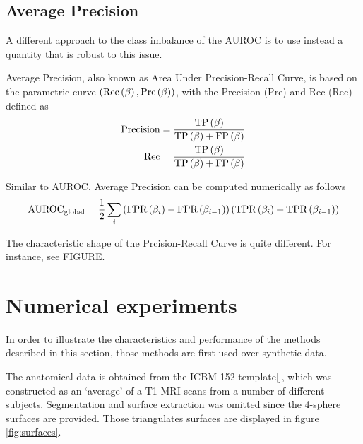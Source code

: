 \subsection{Average Precision}

A different approach to the class imbalance of the AUROC is to use instead a quantity that is robust to this issue.

Average Precision, also known as Area Under Precision-Recall Curve, is based on the parametric curve 
$\left( \text{Rec}\left( \beta \right), \text{Pre}\left( \beta \right) \right)$, with the Precision (Pre) and Rec (Rec) defined as
\begin{align}
\text{Precision}
&=
\frac{ \text{TP}\left( \beta \right) }{\text{TP}\left( \beta \right) + \text{FP}\left( \beta \right)}
\\
\text{Rec}
&=
\frac{ \text{TP}\left( \beta \right) }{\text{TP}\left( \beta \right) + \text{FP}\left( \beta \right)}
\end{align}

Similar to AUROC, Average Precision can be computed numerically as follows
\begin{equation}
\text{AUROC}_\text{global} =
\frac{1}{2}
\sum_{i}
\left(  \text{FPR}\left( \beta_i \right)-\text{FPR}\left( \beta_{i-1} \right)  \right)
\left(  \text{TPR}\left( \beta_i \right)+\text{TPR}\left( \beta_{i-1} \right)  \right)
\end{equation}

The characteristic shape of the Prcision-Recall Curve is quite different. 
%
For instance, see FIGURE.


\section{Numerical experiments}

In order to illustrate the characteristics and performance of the methods described in this section, those methods are first used over synthetic data.

The anatomical data is obtained from the ICBM 152 template[], which was constructed as an `average' of a T1 MRI scans from a number of different subjects.
%
Segmentation and surface extraction was omitted since the 4-sphere surfaces are provided.
%
Those triangulates surfaces are displayed in figure \ref{fig:surfaces}.

